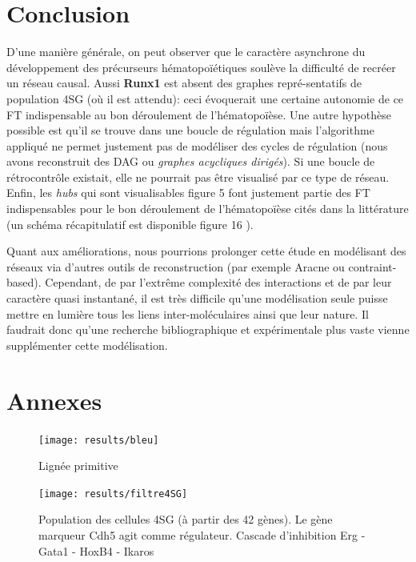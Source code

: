 \documentclass[fleqn,11pt]{SelfArx} %
\providecommand\phantomsection{}
\begin{document}
\section*{Conclusion}
D'une manière générale, on peut observer que le caractère asynchrone du développement des précurseurs hématopoïétiques soulève la difficulté de recréer un réseau causal. Aussi \textbf{Runx1} est absent des graphes repré-sentatifs de population 4SG (où il est attendu): ceci évoquerait une certaine autonomie de ce FT indispensable au bon déroulement de l'hématopoïèse. Une autre hypothèse possible est qu'il se trouve dans une boucle de régulation mais l'algorithme appliqué ne permet justement pas de modéliser des cycles de régulation (nous avons reconstruit des DAG ou \textit{graphes acycliques dirigés}). Si une boucle de rétrocontrôle existait, elle ne pourrait pas être visualisé par ce type de réseau. Enfin, les \textit{hubs} qui sont visualisables figure 5 font justement partie des FT indispensables pour le bon déroulement de l'hématopoïèse cités dans la littérature\cite{Marcelo} (un schéma récapitulatif est disponible figure 16 \cite{Chen}).

\par Quant aux améliorations, nous pourrions prolonger cette étude en modélisant des réseaux via d'autres outils de reconstruction (par exemple Aracne ou contraint-based). Cependant, de par l'extrême complexité des interactions et de par leur caractère quasi instantané, il est très difficile qu'une modélisation seule puisse mettre en lumière tous les liens inter-moléculaires ainsi que leur nature. Il faudrait donc qu'une recherche bibliographique et expérimentale plus vaste vienne supplémenter cette modélisation. 



\phantomsection




\section*{Annexes}

\begin{figure}[ht]
\centering
\texttt{[image: results/bleu]}
\caption{Lignée primitive}
\label{fig:PS}
\end{figure}

\begin{figure}[ht]
\centering
\texttt{[image: results/filtre4SG]}
\caption{Population des cellules 4SG (à partir des 42 gènes). Le gène marqueur Cdh5 agit comme régulateur. Cascade d'inhibition Erg - Gata1 - HoxB4 - Ikaros}
\label{fig:pop4SG}
\end{figure}
\end{document}
